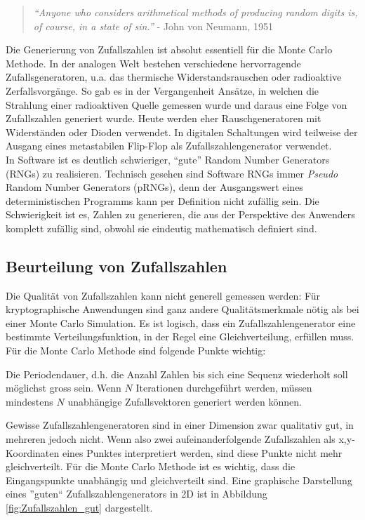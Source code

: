 \documentclass{book}
\begin{document}
\begin{refsection}
\begin{quote}
\textit{“Anyone who considers arithmetical methods of producing random digits is, of course, in a state of sin.”} - John von Neumann, 1951
\end{quote}

Die Generierung von Zufallszahlen ist absolut essentiell für die Monte Carlo Methode. In der analogen Welt bestehen verschiedene hervorragende Zufallsgeneratoren, u.a. das thermische Widerstandsrauschen oder radioaktive Zerfallsvorgänge. So gab es in der Vergangenheit Ansätze, in welchen die Strahlung einer radioaktiven Quelle gemessen wurde und daraus eine Folge von Zufallszahlen generiert wurde. Heute werden eher Rauschgeneratoren mit Widerständen oder Dioden verwendet. In digitalen Schaltungen wird teilweise der Ausgang eines metastabilen Flip-Flop als Zufallszahlengenerator verwendet.\\

In Software ist es deutlich schwieriger, ``gute'' Random Number Generators (RNGs) zu realisieren. Technisch gesehen sind Software RNGs immer \textit{Pseudo} Random Number Generators (pRNGs),  denn der Ausgangswert eines deterministischen Programms kann per Definition nicht zufällig sein. Die Schwierigkeit ist es, Zahlen zu generieren, die aus der Perspektive des Anwenders komplett zufällig sind, obwohl sie eindeutig mathematisch definiert sind.

\subsection{Beurteilung von Zufallszahlen}

Die Qualität von Zufallszahlen kann nicht generell gemessen werden: Für kryptographische Anwendungen sind ganz andere Qualitätsmerkmale nötig als bei einer Monte Carlo Simulation. Es ist logisch, dass ein Zufallszahlengenerator eine bestimmte Verteilungsfunktion, in der Regel eine Gleichverteilung, erfüllen muss. Für die Monte Carlo Methode sind folgende Punkte wichtig:

Die Periodendauer, d.h. die Anzahl Zahlen bis sich eine Sequenz wiederholt soll möglichst gross sein. Wenn $N$ Iterationen durchgeführt werden, müssen mindestens $N$ unabhängige Zufallsvektoren generiert werden können.

Gewisse Zufallszahlengeneratoren sind in einer Dimension zwar qualitativ gut, in mehreren jedoch nicht. Wenn also zwei aufeinanderfolgende Zufallszahlen als x,y-Koordinaten eines Punktes interpretiert werden, sind diese Punkte nicht mehr gleichverteilt. Für die Monte Carlo Methode ist es wichtig, dass die Eingangspunkte unabhängig und gleichverteilt sind. Eine graphische Darstellung eines ''guten`` Zufallszahlengenerators in 2D ist in Abbildung \ref{fig:Zufallszahlen_gut} dargestellt.


\end{refsection}
\end{document}
